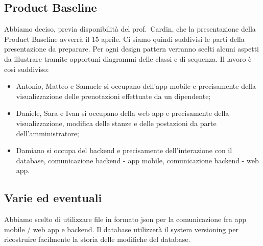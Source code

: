 \subsection*{Product Baseline}
Abbiamo deciso, previa disponibilità del prof.~Cardin, che la presentazione della Product Baseline avverrà il 15 aprile. Ci siamo quindi suddivisi le parti della presentazione da preparare. Per ogni design pattern verranno scelti alcuni aspetti da illustrare tramite opportuni diagrammi delle classi e di sequenza. Il lavoro è così suddiviso:
\begin{itemize}
	\item Antonio, Matteo e Samuele si occupano dell'app mobile e precisamente della visualizzazione delle prenotazioni effettuate da un dipendente;
	\item Daniele, Sara e Ivan si occupano della web app e precisamente della visualizzazione, modifica delle stanze e delle postazioni da parte dell'amministratore;
	\item Damiano si occupa del backend e precisamente dell'interazione con il database, comunicazione backend - app mobile, comunicazione backend - web app.
\end{itemize} 

\subsection*{Varie ed eventuali}
Abbiamo scelto di utilizzare file in formato json per la comunicazione fra app mobile / web app e backend. Il database utilizzerà il system versioning per ricostruire facilmente la storia delle modifiche del database.
